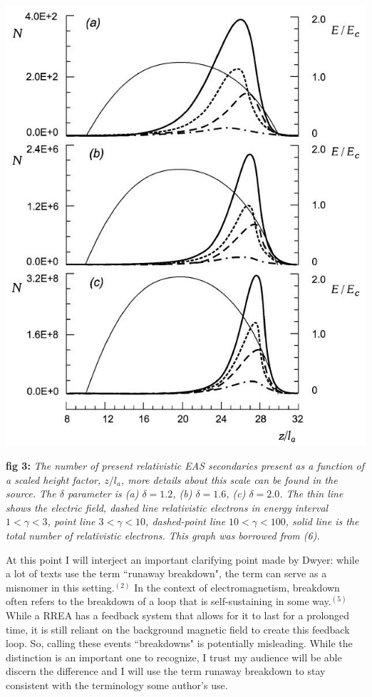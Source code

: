 \documentclass[11pt]{article}
\begin{document}
\begin{multicols*}{2}
    
    \begin{center}
        \includegraphics[width=0.95 \linewidth]{images/Dependence on relativistic electrons plot.JPG}
    \end{center}
    \textbf{fig 3:} \textit{The number of present relativistic EAS secondaries present as a function of a scaled height factor, $z/l_a$, more details about this scale can be found in the source. The $\delta$ parameter is (a) $\delta = 1.2$, (b) $\delta = 1.6$, (c) $\delta = 2.0$. The thin line shows the electric field, dashed line relativistic electrons in energy interval $1< \gamma <3$, point line $3< \gamma < 10$, dashed-point line $10< \gamma <100$, solid line is the total number of relativistic electrons. This graph was borrowed from (6).}
    
    At this point I will interject an important clarifying point made by Dwyer: while a lot of texts use the term ``runaway breakdown", the term can serve as a misnomer in this setting.$^{(2)}$ In the context of electromagnetism, breakdown often refers to the breakdown of a loop that is self-sustaining in some way.$^{(5)}$ While a RREA has a feedback system that allows for it to last for a prolonged time, it is still reliant on the background magnetic field to create this feedback loop. So, calling these events ``breakdowns" is potentially misleading. While the distinction is an important one to recognize, I trust my audience will be able discern the difference and I will use the term runaway breakdown to stay consistent with the terminology some author's use.
    

\end{multicols*}
\end{document}
